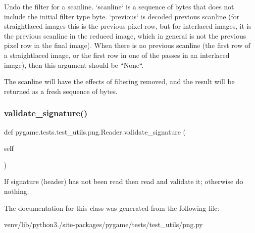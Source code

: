\begin{DoxyVerb}Undo the filter for a scanline.  `scanline` is a sequence of
bytes that does not include the initial filter type byte.
`previous` is decoded previous scanline (for straightlaced
images this is the previous pixel row, but for interlaced
images, it is the previous scanline in the reduced image, which
in general is not the previous pixel row in the final image).
When there is no previous scanline (the first row of a
straightlaced image, or the first row in one of the passes in an
interlaced image), then this argument should be ``None``.

The scanline will have the effects of filtering removed, and the
result will be returned as a fresh sequence of bytes.
\end{DoxyVerb}
 \mbox{\label{classpygame_1_1tests_1_1test__utils_1_1png_1_1_reader_a95c0b314ab562685959942ca345d2621}} 
\subsubsection{\texorpdfstring{validate\+\_\+signature()}{validate\_signature()}}
{\footnotesize\ttfamily def pygame.\+tests.\+test\+\_\+utils.\+png.\+Reader.\+validate\+\_\+signature (\begin{DoxyParamCaption}\item[{}]{self }\end{DoxyParamCaption})}

\begin{DoxyVerb}If signature (header) has not been read then read and
validate it; otherwise do nothing.
\end{DoxyVerb}
 

The documentation for this class was generated from the following file\+:\begin{DoxyCompactItemize}
\item 
venv/lib/python3./site-\/packages/pygame/tests/test\+\_\+utils/png.\+py\end{DoxyCompactItemize}
